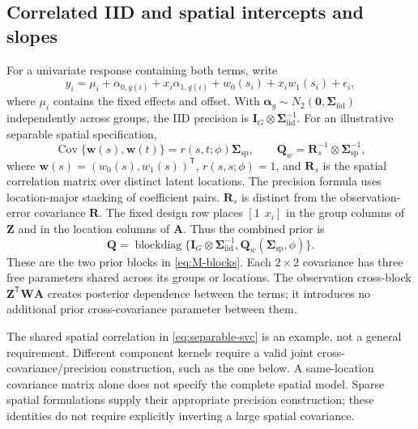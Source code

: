 \documentclass[11pt]{article}
\newcommand{\bw}{\bm{w}}
\newcommand{\balpha}{\bm{\alpha}}
\newcommand{\bA}{\bm{A}}
\newcommand{\bI}{\bm{I}}
\newcommand{\bQ}{\bm{Q}}
\newcommand{\bR}{\bm{R}}
\newcommand{\bW}{\bm{W}}
\newcommand{\bZ}{\bm{Z}}
\newcommand{\bSigma}{\bm{\Sigma}}
\newcommand{\bzero}{\bm{0}}
\newcommand{\trans}{^{\mathsf T}}
\DeclareMathOperator{\blockdiag}{blockdiag}
\DeclareMathOperator{\Cov}{Cov}
\begin{document}
\subsection{Correlated IID and spatial intercepts and slopes}
For a univariate response containing both terms, write
\begin{equation}
 y_i=\mu_i+\alpha_{0,g(i)}+x_i\alpha_{1,g(i)}
              +w_0(s_i)+x_iw_1(s_i)+\epsilon_i,
\end{equation}
where $\mu_i$ contains the fixed effects and offset. With
$\balpha_g\sim N_2(\bzero,\bSigma_{\mathrm{iid}})$ independently across groups,
the IID precision is $\bI_G\otimes\bSigma_{\mathrm{iid}}^{-1}$.
For an illustrative separable spatial specification,
\begin{equation}\label{eq:separable-svc}
 \Cov\{\bw(s),\bw(t)\}=r(s,t;\phi)\bSigma_{\mathrm{sp}},\qquad
 \bQ_w=\bR_s^{-1}\otimes\bSigma_{\mathrm{sp}}^{-1},
\end{equation}
where $\bw(s)=(w_0(s),w_1(s))\trans$, $r(s,s;\phi)=1$, and $\bR_s$ is the
spatial correlation matrix over distinct latent locations. The precision formula
uses location-major stacking of coefficient pairs. $\bR_s$ is distinct from the
observation-error covariance $\bR$.
The fixed design row places $[1\ \ x_i]$ in the group columns of $\bZ$ and in
the location columns of $\bA$. Thus the combined prior is
\begin{equation}\label{eq:iid-spatial-prior}
 \bQ=\blockdiag\{\bI_G\otimes\bSigma_{\mathrm{iid}}^{-1},
                 \bQ_w(\bSigma_{\mathrm{sp}},\phi)\}.
\end{equation}
These are the two prior blocks in \eqref{eq:M-blocks}. Each $2\times2$ covariance
has three free parameters shared across its groups or locations. The observation
cross-block $\bZ\trans\bW\bA$ creates posterior dependence between the terms;
it introduces no additional prior cross-covariance parameter between them.

The shared spatial correlation in \eqref{eq:separable-svc} is an example, not
a general requirement. Different component kernels require a valid joint
cross-covariance/precision construction, such as the one below. A same-location
covariance matrix alone does not specify the complete spatial model. Sparse
spatial formulations supply their appropriate precision construction; these
identities do not require explicitly inverting a large spatial covariance.
\end{document}
